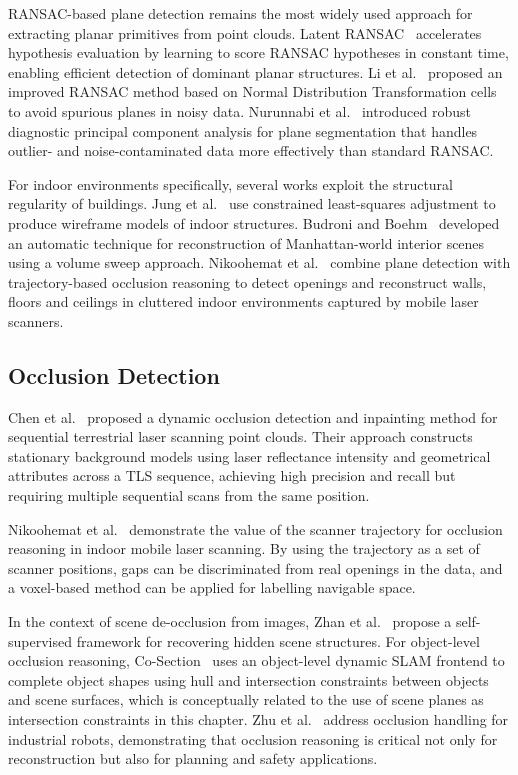 RANSAC-based plane detection remains the most widely used approach for extracting planar primitives from point clouds. Latent RANSAC~\cite{korman_latent_2018} accelerates hypothesis evaluation by learning to score RANSAC hypotheses in constant time, enabling efficient detection of dominant planar structures. Li et al.~\cite{li_improved_2017} proposed an improved RANSAC method based on Normal Distribution Transformation cells to avoid spurious planes in noisy data. Nurunnabi et al.~\cite{nurunnabi_robust_2016} introduced robust diagnostic principal component analysis for plane segmentation that handles outlier- and noise-contaminated data more effectively than standard RANSAC.

For indoor environments specifically, several works exploit the structural regularity of buildings. Jung et al.~\cite{jung_automated_2016} use constrained least-squares adjustment to produce wireframe models of indoor structures. Budroni and Boehm~\cite{budroni_automatic_2010} developed an automatic technique for reconstruction of Manhattan-world interior scenes using a volume sweep approach. Nikoohemat et al.~\cite{nikoohemat_exploiting_2017} combine plane detection with trajectory-based occlusion reasoning to detect openings and reconstruct walls, floors and ceilings in cluttered indoor environments captured by mobile laser scanners.


\subsection{Occlusion Detection}
\label{sec:5_rw_occlusion}
Chen et al.~\cite{chen_dynamic_2016} proposed a dynamic occlusion detection and inpainting method for sequential terrestrial laser scanning point clouds. Their approach constructs stationary background models using laser reflectance intensity and geometrical attributes across a TLS sequence, achieving high precision and recall but requiring multiple sequential scans from the same position.

Nikoohemat et al.~\cite{nikoohemat_change_2018} demonstrate the value of the scanner trajectory for occlusion reasoning in indoor mobile laser scanning. By using the trajectory as a set of scanner positions, gaps can be discriminated from real openings in the data, and a voxel-based method can be applied for labelling navigable space.

In the context of scene de-occlusion from images, Zhan et al.~\cite{zhan_self-supervised_2020} propose a self-supervised framework for recovering hidden scene structures. For object-level occlusion reasoning, Co-Section~\cite{strecke_where_2020} uses an object-level dynamic SLAM frontend to complete object shapes using hull and intersection constraints between objects and scene surfaces, which is conceptually related to the use of scene planes as intersection constraints in this chapter. Zhu et al.~\cite{zhu_occlusion_2020} address occlusion handling for industrial robots, demonstrating that occlusion reasoning is critical not only for reconstruction but also for planning and safety applications.

